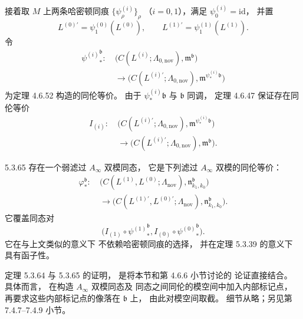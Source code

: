 接着取 $M$ 上两条哈密顿同痕
$\{\psi_\rho^{(i)}\}_\rho$
（$i=0,1$），满足
$\psi_0^{(i)}=\mathrm{id}$，
并置
\[
L^{(0)\prime}
=\psi_1^{(0)}(L^{(0)}),
\qquad
L^{(1)\prime}
=\psi_1^{(1)}(L^{(1)}).
\]
令
\[
\begin{aligned}
{\psi^{(i)}}_*^{\mathfrak b}\colon\
&\bigl(
C(L^{(i)};\Lambda_{0,\mathrm{nov}}),
\mathfrak m^{\mathfrak b}
\bigr)\\
&\longrightarrow
\bigl(
C(L^{(i)\prime};\Lambda_{0,\mathrm{nov}}),
\mathfrak m^{\psi_*^{(i)}\mathfrak b}
\bigr)
\end{aligned}
\]
为定理 4.6.52 构造的同伦等价。
由于
$\psi_*^{(i)}\mathfrak b$
与 $\mathfrak b$ 同调，
定理 4.6.47 保证存在同伦等价
\[
\begin{aligned}
I_{(i)}\colon\
&\bigl(
C(L^{(i)\prime};\Lambda_{0,\mathrm{nov}}),
\mathfrak m^{\psi_*^{(i)}\mathfrak b}
\bigr)\\
&\longrightarrow
\bigl(
C(L^{(i)\prime};\Lambda_{0,\mathrm{nov}}),
\mathfrak m^{\mathfrak b}
\bigr).
\end{aligned}
\]

\begin{theorem}{5.3.65}\label{thm:5-3-65}
存在一个弱滤过 $A_\infty$ 双模同态，
它是下列滤过 $A_\infty$ 双模的同伦等价：
\[
\begin{aligned}
\varphi_*^{\mathfrak b}\colon\
&\bigl(
C(L^{(1)},L^{(0)};\Lambda_{\mathrm{nov}}),
\mathfrak n^{\mathfrak b}_{k_1,k_0}
\bigr)\\
&\longrightarrow
\bigl(
C(L^{(1)\prime},L^{(0)\prime};
\Lambda_{\mathrm{nov}}),
\mathfrak n^{\mathfrak b}_{k_1,k_0}
\bigr).
\end{aligned}
\]
它覆盖同态对
\[
\bigl(
I_{(1)}\circ{\psi^{(1)}}_*^{\mathfrak b},
I_{(0)}\circ{\psi^{(0)}}_*^{\mathfrak b}
\bigr).
\]
它在与上文类似的意义下
不依赖哈密顿同痕的选择，
并在定理 5.3.39 的意义下
具有函子性。
\end{theorem}

定理 5.3.64 与 5.3.65 的证明，
是将本节和第 4.6.6 小节讨论的
论证直接结合。
具体而言，
在构造 $A_\infty$ 双模同态及
同态之间同伦的模空间中加入内部标记点，
再要求这些内部标记点的像落在
$\mathfrak b$ 上，
由此对模空间取截。
细节从略；另见第 7.4.7--7.4.9 小节。
